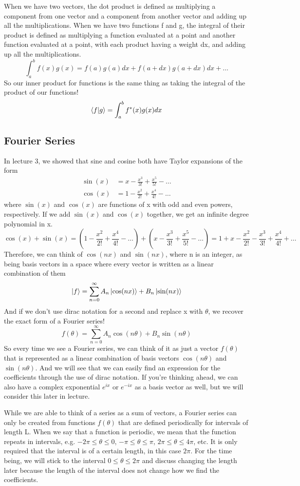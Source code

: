 \documentclass{article}
\newcommand{\be}{\begin{equation}}
\newcommand{\ee}{\end{equation}}
\begin{document}
When we have two vectors, the dot product is defined as multiplying a component from one vector and a component from another vector and adding up all the multiplications.
When we have two functions f and g, the integral of their product is defined as multiplying a function evaluated at a point and another function evaluated at a point, with each product having a weight dx, and adding up all the multiplications.
\be
  \int_a^b f(x)g(x) = f(a)g(a)dx + f(a + dx)g(a + dx)dx + \hdots
\ee
So our inner product for functions is the same thing as taking the integral of the product of our functions!
\be
  \braket{f|g} = \int_a^b f^*(x)g(x) dx
\ee

\subsection*{Fourier Series}
In lecture 3, we showed that sine and cosine both have Taylor expansions of the form
\be
  \begin{split}
    \sin(x) &= x - \frac{x^3}{3!} + \frac{x^5}{5!} - \hdots \\
    \cos(x) &= 1 - \frac{x^2}{2!} + \frac{x^4}{4!} - \hdots
  \end{split}
\ee
where $\sin(x)$ and $\cos(x)$ are functions of x with odd and even powers, respectively.
If we add $\sin(x)$ and $\cos(x)$ together, we get an infinite degree polynomial in x.
\be
  \cos(x) + \sin(x) = (1 - \frac{x^2}{2!} + \frac{x^4}{4!} - \hdots) + (x - \frac{x^3}{3!} + \frac{x^5}{5!} - \hdots) = 1 + x - \frac{x^2}{2!} - \frac{x^3}{3!} + \frac{x^4}{4!} + \hdots
\ee
Therefore, we can think of $\cos(nx)$ and $\sin(nx)$, where n is an integer, as being basis vectors in a space where every vector is written as a linear combination of them
\be
  \ket{f} = \sum_{n = 0}^{\infty} A_n \ket{\cos(nx)} + B_n \ket{\sin(nx)}
\ee
And if we don't use dirac notation for a second and replace x with $\theta$, we recover the exact form of a Fourier series!
\be
  f(\theta) = \sum_{n = 0}^{\infty} A_n \cos(n \theta) + B_n \sin(n \theta)
\ee
So every time we see a Fourier series, we can think of it as just a vector $f(\theta)$ that is represented as a linear combination of basis vectors $\cos(n \theta)$ and $\sin(n \theta)$.
And we will see that we can easily find an expression for the coefficients through the use of dirac notation.
If you're thinking ahead, we can also have a complex exponential $e^{ix}$ or $e^{-ix}$ as a basis vector as well, but we will consider this later in lecture.

While we are able to think of a series as a sum of vectors, a Fourier series can only be created from functions $f(\theta)$ that are defined periodically for intervals of length L.
When we say that a function is periodic, we mean that the function repeats in intervals, e.g. $- 2\pi \leq \theta \leq 0$, $- \pi \leq \theta \leq \pi$, $2 \pi \leq \theta \leq 4 \pi $, etc.
It is only required that the interval is of a certain length, in this case $2 \pi$.
For the time being, we will stick to the interval $0 \leq \theta \leq 2 \pi$ and discuss changing the length later because the length of the interval does not change how we find the coefficients.
\end{document}

